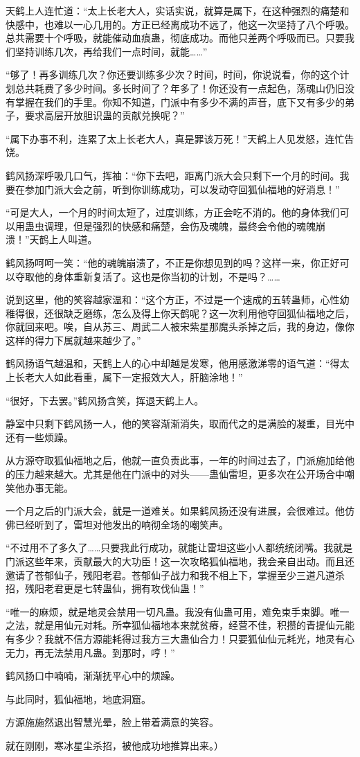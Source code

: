\begin{this_body}
天鹤上人连忙道：“太上长老大人，实话实说，就算是属下，在这种强烈的痛楚和快感中，也难以一心几用的。方正已经离成功不远了，他这一次坚持了八个呼吸。总共需要十个呼吸，就能催动血痕蛊，彻底成功。而他只差两个呼吸而已。只要我们坚持训练几次，再给我们一点时间，就能……”

“够了！再多训练几次？你还要训练多少次？时间，时间，你说说看，你的这个计划总共耗费了多少时间。多长时间了？年多了！你还没有一点起色，荡魂山仍旧没有掌握在我们的手里。你知不知道，门派中有多少不满的声音，底下又有多少的弟子，要求高层开放胆识蛊的贡献兑换呢？”

“属下办事不利，连累了太上长老大人，真是罪该万死！”天鹤上人见发怒，连忙告饶。

鹤风扬深呼吸几口气，挥袖：“你下去吧，距离门派大会只剩下一个月的时间。我要在参加门派大会之前，听到你训练成功，可以发动夺回狐仙福地的好消息！”

“可是大人，一个月的时间太短了，过度训练，方正会吃不消的。他的身体我们可以用蛊虫调理，但是强烈的快感和痛楚，会伤及魂魄，最终会令他的魂魄崩溃！”天鹤上人叫道。

鹤风扬呵呵一笑：“他的魂魄崩溃了，不正是你想见到的吗？这样一来，你正好可以夺取他的身体重新复活了。这也是你当初的计划，不是吗？……

说到这里，他的笑容越家温和：“这个方正，不过是一个速成的五转蛊师，心性幼稚得很，还很缺乏磨练，怎么及得上你天鹤呢？这一次利用他夺回狐仙福地之后，你就回来吧。唉，自从苏三、周武二人被宋紫星那魔头杀掉之后，我的身边，像你这样的得力下属就越来越少了。”

鹤风扬语气越温和，天鹤上人的心中却越是发寒，他用感激涕零的语气道：“得太上长老大人如此看重，属下一定报效大人，肝脑涂地！”

“很好，下去罢。”鹤风扬含笑，挥退天鹤上人。

静室中只剩下鹤风扬一人，他的笑容渐渐消失，取而代之的是满脸的凝重，目光中还有一些烦躁。

从方源夺取狐仙福地之后，他就一直负责此事，一年的时间过去了，门派施加给他的压力越来越大。尤其是他在门派中的对头——蛊仙雷坦，更多次在公开场合中嘲笑他办事无能。

一个月之后的门派大会，就是一道难关。如果鹤风扬还没有进展，会很难过。他仿佛已经听到了，雷坦对他发出的响彻全场的嘲笑声。

“不过用不了多久了……只要我此行成功，就能让雷坦这些小人都统统闭嘴。我就是门派这些年来，贡献最大的大功臣！这一次攻略狐仙福地，我会亲自出动。而且还邀请了苍郁仙子，残阳老君。苍郁仙子战力和我不相上下，掌握至少三道凡道杀招，残阳老君更是七转蛊仙，拥有攻伐仙蛊！”

“唯一的麻烦，就是地灵会禁用一切凡蛊。我没有仙蛊可用，难免束手束脚。唯一之法，就是用仙元对耗。所幸狐仙福地本来就贫瘠，经营不佳，积攒的青提仙元能有多少？我就不信方源能耗得过我方三大蛊仙合力！只要狐仙仙元耗光，地灵有心无力，再无法禁用凡蛊。到那时，哼！”

鹤风扬口中喃喃，渐渐抚平心中的烦躁。

与此同时，狐仙福地，地底洞窟。

方源施施然退出智慧光晕，脸上带着满意的笑容。

就在刚刚，寒冰星尘杀招，被他成功地推算出来。）

\end{this_body}

